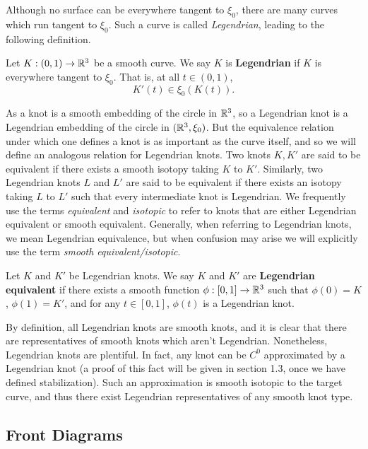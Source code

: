 Although no surface can be everywhere tangent to $\xi_0$, there are many curves which run tangent to $\xi_0$. Such a curve is called \emph{Legendrian}, leading to the following definition.

\begin{definition}
    Let $K: (0, 1) \to \mathbb{R}^3$ be a smooth curve. We say $K$ is \textbf{Legendrian} if $K$ is everywhere tangent to $\xi_0$. That is, at all $t \in (0, 1)$,
    \[
        K'(t) \in \xi_0(K(t)).
    \]
\end{definition}

As a knot is a smooth embedding of the circle in $\mathbb{R}^3$, so a Legendrian knot is a Legendrian embedding of the circle in $(\mathbb{R}^3, \xi_0)$. But the equivalence relation under which one defines a knot is as important as the curve itself, and so we will define an analogous relation for Legendrian knots. Two knots $K, K'$ are said to be equivalent if there exists a smooth isotopy taking $K$ to $K'$. Similarly, two Legendrian knots $L$ and $L'$ are said to be equivalent if there exists an isotopy taking $L$ to $L'$ such that every intermediate knot is Legendrian.
We frequently use the terms \emph{equivalent} and \emph{isotopic} to refer to knots that are either Legendrian equivalent or smooth equivalent. Generally, when referring to Legendrian knots, we mean Legendrian equivalence, but when confusion may arise we will explicitly use the term \emph{smooth equivalent/isotopic}.

\begin{definition}
    Let $K$ and $K'$ be Legendrian knots. We say $K$ and $K'$ are \textbf{Legendrian equivalent} if there exists a smooth function $\phi: [0, 1] \to \mathbb{R}^3$ such that
    $\phi(0) = K$, $\phi(1) = K'$, and for any $t \in [0, 1]$, $\phi(t)$ is a Legendrian knot.
\end{definition}

By definition, all Legendrian knots are smooth knots, and it is clear that there are representatives of smooth knots which aren't Legendrian. Nonetheless, Legendrian knots are plentiful. In fact, any knot can be $C^0$ approximated by a Legendrian knot (a proof of this fact will be given in section 1.3, once we have defined stabilization).
Such an approximation is smooth isotopic to the target curve, and thus there exist Legendrian representatives of any smooth knot type.

\subsection{Front Diagrams}

